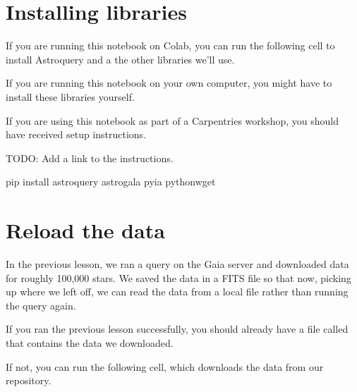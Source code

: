\documentclass[letterpaper,10pt,english]{sphinxmanual}
\begin{document}
\section{Installing libraries}
\label{\detokenize{03_motion:installing-libraries}}
If you are running this notebook on Colab, you can run the following cell to install Astroquery and a the other libraries we’ll use.

If you are running this notebook on your own computer, you might have to install these libraries yourself.

If you are using this notebook as part of a Carpentries workshop, you should have received setup instructions.

TODO: Add a link to the instructions.

\begin{sphinxVerbatim}[commandchars=\\\{\}]

 
    

 
    pip install astroquery astro\PYGZhy{}gala pyia python\PYGZhy{}wget
\end{sphinxVerbatim}


\section{Reload the data}
\label{\detokenize{03_motion:reload-the-data}}
In the previous lesson, we ran a query on the Gaia server and downloaded data for roughly 100,000 stars.  We saved the data in a FITS file so that now, picking up where we left off, we can read the data from a local file rather than running the query again.

If you ran the previous lesson successfully, you should already have a file called  that contains the data we downloaded.

If not, you can run the following cell, which downloads the data from our repository.

\begin{sphinxVerbatim}[commandchars=\\\{\}]
 
   

  
  

  
\end{sphinxVerbatim}
\end{document}
